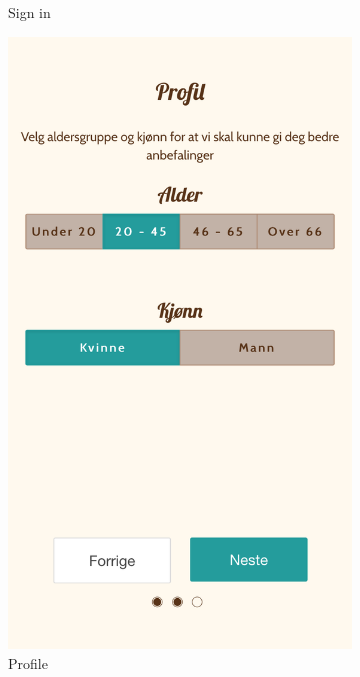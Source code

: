 \begin{appendices}
\begin{figure}[h!]
\begin{subfigure}[h]{0.32\textwidth}
			\caption{Sign in}
		\end{subfigure}
		\begin{subfigure}[h]{0.32\textwidth}
			\includegraphics[width=\textwidth]{fig/screenshot_profile}
			\caption{Profile}
		\end{subfigure}
		\begin{subfigure}[h]{0.32\textwidth}

\end{subfigure}
\end{figure}
\end{appendices}
